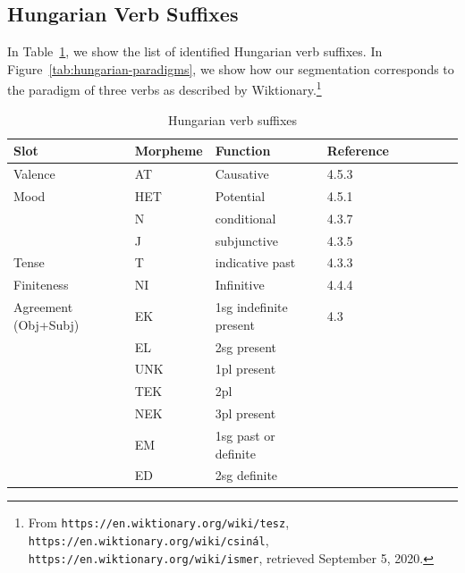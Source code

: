 \documentclass[11pt,letterpaper]{article}
\begin{document}
\subsection{Hungarian Verb Suffixes}


In Table~\ref{tab:hungarian-suffixes}, we show the list of identified Hungarian verb suffixes.
In Figure~\ref{tab:hungarian-paradigms}, we show how our segmentation corresponds to the paradigm of three verbs as described by Wiktionary.\footnote{From \texttt{https://en.wiktionary.org/wiki/tesz},
\texttt{https://en.wiktionary.org/wiki/csinál},
\texttt{https://en.wiktionary.org/wiki/ismer}, retrieved September 5, 2020.}





\begin{table}
    \centering
    \begin{tabular}{lllllllll}
    Slot & Morpheme & Function & Reference    \\ \hline\hline
Valence	    & AT & Causative &   \cite{rounds2001hungarian} 4.5.3 \\ \hline
Mood	    & HET & Potential &   \cite{rounds2001hungarian} 4.5.1  \\
         & N & conditional &   \cite{rounds2001hungarian} 4.3.7 \\
         & J & subjunctive &   \cite{rounds2001hungarian} 4.3.5 \\
\hline
Tense& T & indicative past &  \cite{rounds2001hungarian} 4.3.3 \\
         \hline
Finiteness  & NI & Infinitive  &  \cite{rounds2001hungarian} 4.4.4 \\
\hline
Agreement (Obj+Subj)         & EK & 1sg indefinite present & \cite{rounds2001hungarian} 4.3 \\
         & EL & 2sg present\\
         & UNK & 1pl present\\
         & TEK & 2pl\\
         & NEK & 3pl present\\
         & EM & 1sg past or definite \\
         & ED & 2sg definite \\
         \hline
    \end{tabular}
    \caption{Hungarian verb suffixes}
    \label{tab:hungarian-suffixes}
\end{table}
\end{document}
